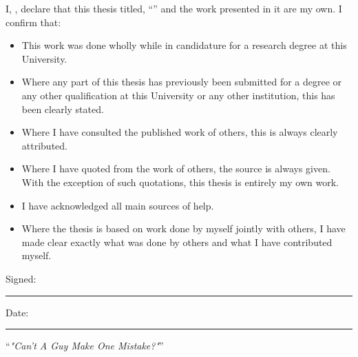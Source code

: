 \documentclass[
11pt, %
oneside, %
english, %
onehalfspacing, %
nolistspacing, %
parskip, %
headsepline, %
]{MastersDoctoralThesis} %
\begin{document}

\begin{declaration}
\addchaptertocentry{\authorshipname} %
\noindent I, \authorname, declare that this thesis titled, \enquote{\ttitle} and the work presented in it are my own. I confirm that:

\begin{itemize} 
\item This work was done wholly while in candidature for a research degree at this University.
\item Where any part of this thesis has previously been submitted for a degree or any other qualification at this University or any other institution, this has been clearly stated.
\item Where I have consulted the published work of others, this is always clearly attributed.
\item Where I have quoted from the work of others, the source is always given. With the exception of such quotations, this thesis is entirely my own work.
\item I have acknowledged all main sources of help.
\item Where the thesis is based on work done by myself jointly with others, I have made clear exactly what was done by others and what I have contributed myself.\\
\end{itemize}
 
\noindent Signed:\\
\rule[0.5em]{25em}{0.5pt} %
 
\noindent Date:\\
\rule[0.5em]{25em}{0.5pt} %
\end{declaration}

\cleardoublepage


\vspace*{0.2\textheight}

\centerline{\noindent\enquote{\itshape"Can't A Guy Make One Mistake?"}}\bigbreak
\end{document}

